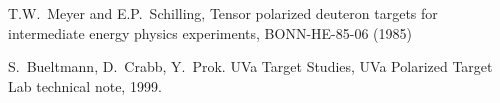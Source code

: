 \documentclass[11pt]{article}
\begin{document}


%
\newpage
\begin{thebibliography}{6}

 T.W.~Meyer and E.P.~Schilling, Tensor polarized deuteron targets for intermediate energy physics experiments, BONN-HE-85-06 (1985)

 S.~Bueltmann, D.~Crabb, Y.~Prok. UVa Target Studies, UVa Polarized Target Lab technical note, 1999.





\end{thebibliography} 
\end{document}
